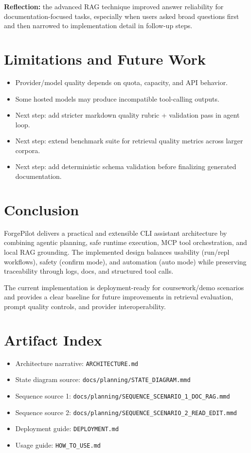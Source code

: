 \documentclass[11pt, letterpaper]{article}
\begin{document}
\textbf{Reflection:} the advanced RAG technique improved answer reliability for
documentation-focused tasks, especially when users asked broad questions first and
then narrowed to implementation detail in follow-up steps.

\section{Limitations and Future Work}

\begin{itemize}
    \item Provider/model quality depends on quota, capacity, and API behavior.
    \item Some hosted models may produce incompatible tool-calling outputs.
    \item Next step: add stricter markdown quality rubric + validation pass in agent loop.
    \item Next step: extend benchmark suite for retrieval quality metrics across larger corpora.
    \item Next step: add deterministic schema validation before finalizing generated documentation.
\end{itemize}

\section{Conclusion}

ForgePilot delivers a practical and extensible CLI assistant architecture by combining
agentic planning, safe runtime execution, MCP tool orchestration, and local RAG grounding.
The implemented design balances usability (run/repl workflows), safety (confirm mode), and
automation (auto mode) while preserving traceability through logs, docs, and structured tool calls.

The current implementation is deployment-ready for coursework/demo scenarios and provides a
clear baseline for future improvements in retrieval evaluation, prompt quality controls, and
provider interoperability.

\appendix
\section{Artifact Index}

\begin{itemize}
    \item Architecture narrative: \texttt{ARCHITECTURE.md}
    \item State diagram source: \texttt{docs/planning/STATE\_DIAGRAM.mmd}
    \item Sequence source 1: \texttt{docs/planning/SEQUENCE\_SCENARIO\_1\_DOC\_RAG.mmd}
    \item Sequence source 2: \texttt{docs/planning/SEQUENCE\_SCENARIO\_2\_READ\_EDIT.mmd}
    \item Deployment guide: \texttt{DEPLOYMENT.md}
    \item Usage guide: \texttt{HOW\_TO\_USE.md}
\end{itemize}
\end{document}
